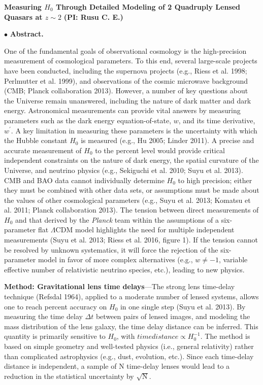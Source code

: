 \documentclass[a4paper,11pt]{article}
\begin{document}
\begin {centering}
{\bf Measuring $H_0$ Through Detailed Modeling of 2 Quadruply Lensed Quasars at $z\sim2$} {\bf (PI: Rusu C. E.)}\\
 \end{centering}
 
\medskip

$\bullet$ {\bf Abstract.}

One of the fundamental goals of observational cosmology is the high-precision
measurement of cosmological parameters. To this end, several large-scale projects have been
conducted, including the supernova projects (e.g., Riess et al. 1998; Perlmutter et al. 1999), and observations of
the cosmic microwave background (CMB; Planck collaboration 2013). However, a number of key questions about the
Universe remain unanswered, including the nature of dark matter and dark energy. Astronomical measurements can provide vital answers by measuring
parameters such as the dark energy equation-of-state, $w$, and its time derivative, $w^{\prime}$. A key limitation in measuring these parameters is the
uncertainty with which the Hubble constant  $H_{0}$  is measured (e.g., Hu 2005; Linder 2011). A
precise and accurate measurement of $H_{0}$ to the percent level would provide critical
independent constraints on the nature of dark energy, the spatial curvature of the Universe, and
neutrino physics (e.g., Sekiguchi et al. 2010; Suyu et al. 2013). CMB
and BAO data cannot individually determine $H_{0}$ to high precision; either they must be combined with other data sets, or assumptions must be made about the values of other cosmological parameters (e.g., Suyu et al. 2013; Komatsu et al. 2011; Planck collaboration 2013). The tension between direct
measurements of $H_{0}$ and that derived by the {\it Planck} team within the assumptions of a six-parameter flat $\Lambda$CDM model highlights the need for multiple independent measurements (Suyu et al. 2013; Riess et al. 2016, figure 1). If the tension cannot
be resolved by unknown systematics, it will force the rejection of the six-parameter model in favor of
more complex alternatives (e.g., $w \ne -1$, variable effective number of relativistic neutrino species, etc.), leading to new physics.

{\bf Method: Gravitational lens time delays}---The strong lens time-delay technique (Refsdal 1964),
applied to a moderate number of lensed systems, allows one to reach
percent accuracy on $H_{0}$ in one single step (Suyu et al. 2013). By
measuring the time delay $\Delta t$ between pairs of lensed images, and modeling the mass distribution of
the lens galaxy, the time delay distance can be inferred. This quantity is primarily sensitive to
$H_{0}$, with $time distance \propto H_{0}^{-1}$. The method is based
on simple geometry and well-tested physics (i.e., general relativity) rather than complicated
astrophysics (e.g., dust, evolution, etc.). Since each time-delay
distance is independent, a sample of N time-delay lenses would lead to a reduction in the
statistical uncertainty by $\sqrt{\mathrm{N}}$.
\end{document}
